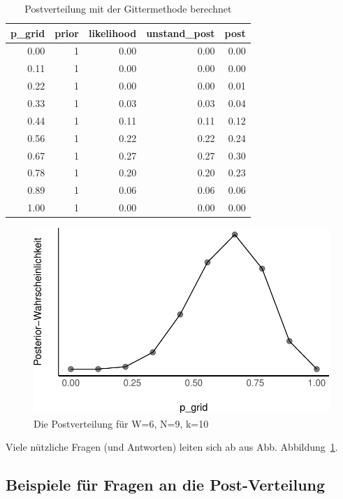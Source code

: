\documentclass[
  a4paper,
  DIV=11]{scrreprt}
\theoremstyle{definition}
\theoremstyle{remark}
\begin{document}
\hypertarget{tbl-post1}{}
\begin{longtable}{rrrrr}
\caption{\label{tbl-post1}Postverteilung mit der Gittermethode berechnet }\tabularnewline

\toprule
p\_grid & prior & likelihood & unstand\_post & post \\ 
\midrule
0.00 & 1 & 0.00 & 0.00 & 0.00 \\ 
0.11 & 1 & 0.00 & 0.00 & 0.00 \\ 
0.22 & 1 & 0.00 & 0.00 & 0.01 \\ 
0.33 & 1 & 0.03 & 0.03 & 0.04 \\ 
0.44 & 1 & 0.11 & 0.11 & 0.12 \\ 
0.56 & 1 & 0.22 & 0.22 & 0.24 \\ 
0.67 & 1 & 0.27 & 0.27 & 0.30 \\ 
0.78 & 1 & 0.20 & 0.20 & 0.23 \\ 
0.89 & 1 & 0.06 & 0.06 & 0.06 \\ 
1.00 & 1 & 0.00 & 0.00 & 0.00 \\ 
\bottomrule
\end{longtable}

\begin{figure}

{\centering \includegraphics{./Post_files/figure-pdf/fig-post1-1.pdf}

}

\caption{\label{fig-post1}Die Postverteilung für W=6, N=9, k=10}

\end{figure}

Viele nützliche Fragen (und Antworten) leiten sich ab aus Abb.
Abbildung~\ref{fig-post1}.

\hypertarget{beispiele-fuxfcr-fragen-an-die-post-verteilung}{%
\subsection{Beispiele für Fragen an die
Post-Verteilung}\label{beispiele-fuxfcr-fragen-an-die-post-verteilung}}
\end{document}
